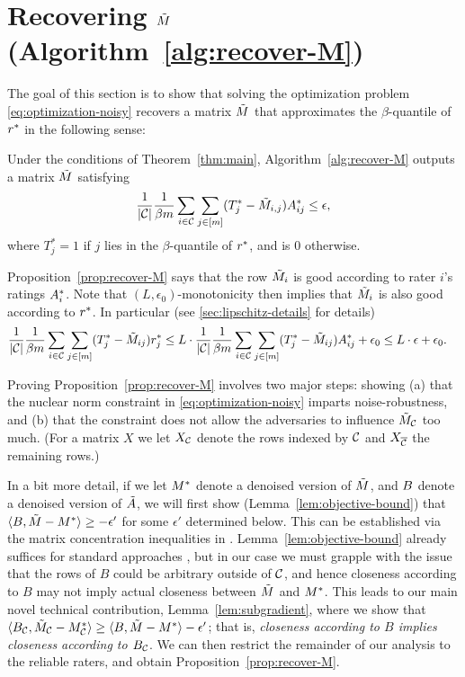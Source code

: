 \section{Recovering $\tilde{M}$ (Algorithm~\ref{alg:recover-M})}
\label{sec:approach-M}

The goal of this section is to show that solving the optimization 
problem \eqref{eq:optimization-noisy} recovers a matrix $\tilde{M}$ that 
approximates the $\beta$-quantile of $r^*$ in the following sense:
\begin{proposition}
\label{prop:recover-M}
Under the conditions of Theorem~\ref{thm:main}, Algorithm~\ref{alg:recover-M} 
outputs a matrix $\tilde{M}$ satisfying 
\[ \frac{1}{|\mathcal{C}|} \frac{1}{\beta m} \sum_{i \in \mathcal{C}} \sum_{j \in [m]} (T^*_j - \tilde{M}_{i,j})A^*_{ij} \leq \epsilon, \]
where $T^*_j = 1$ if $j$ lies in the $\beta$-quantile of $r^*$, and is $0$ otherwise.
\end{proposition}
Proposition~\ref{prop:recover-M} says that the row $\tilde{M}_i$ 
is good according to rater $i$'s ratings $A^*_i$. Note that
$(L,\epsilon_0)$-monotonicity 
then implies that $\tilde{M}_i$ is also good according to $r^*$.
In particular (see \ref{sec:lipschitz-details} for details)
\begin{align}
\label{eq:lipschitz-usage}
\frac{1}{|\mathcal{C}|}\frac{1}{\beta m}\sum_{i \in \mathcal{C}}\sum_{j \in [m]} (T_j^*-\tilde{M}_{ij})r^*_j
&\leq L \cdot \frac{1}{|\mathcal{C}|}\frac{1}{\beta m}\sum_{i \in \mathcal{C}}\sum_{j \in [m]} (T_j^*-\tilde{M}_{ij})A^*_{ij} + \epsilon_0 
\leq L \cdot \epsilon + \epsilon_0.
\end{align}

Proving Proposition~\ref{prop:recover-M} involves two major steps: showing 
(a) that the nuclear norm constraint in \eqref{eq:optimization-noisy} 
imparts noise-robustness, and (b) that the constraint does not allow 
the adversaries to influence $\tilde{M}_{\mathcal{C}}$ too much. (For a matrix $X$ 
we let $X_{\mathcal{C}}$ denote the rows indexed by $\mathcal{C}$ and $X_{\overline{\mathcal{C}}}$ the remaining rows.)

In a bit 
more detail, if we let $M^*$ denote a denoised version of $\tilde{M}$, and $B$ 
denote a denoised version of $\tilde{A}$, we will first show 
(Lemma~\ref{lem:objective-bound}) that 
$\langle B, \tilde{M} - M^* \rangle \geq -\epsilon'$ for some $\epsilon'$ 
determined below. This can be established via the matrix concentration 
inequalities in \citet{le2015concentration}. Lemma~\ref{lem:objective-bound} already 
suffices for standard approaches \citep[e.g.,][]{guedon2014community}, 
but in our case we must grapple with the issue that the rows of $B$ could be 
arbitrary outside of $\mathcal{C}$, and hence closeness according to $B$ may not 
imply actual closeness between $\tilde{M}$ and $M^*$. This leads to our main 
novel technical contribution, Lemma~\ref{lem:subgradient}, where we show 
that $\langle B_{\mathcal{C}}, \tilde{M}_{\mathcal{C}} - M^*_{\mathcal{C}} \rangle \geq \langle B, \tilde{M} - M^* \rangle - \epsilon'$; 
that is, \emph{closeness according to $B$ implies closeness according to 
$B_{\mathcal{C}}$}. We can then restrict the remainder of our analysis to the 
reliable raters, and obtain Proposition~\ref{prop:recover-M}.


